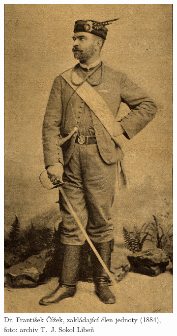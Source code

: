 \documentclass[a5paper, 11pt, twoside]{article}
\begin{document}
\begin{figure}[h]
  \centering
  \begin{subfigure}[c]{0.4\textwidth}
   \includegraphics[width=\textwidth]{img/03_cizek.jpg}
  \caption*{Dr. František Čížek, zakládající člen jednoty (1884), foto: archiv T.~J. Sokol Libeň }
  \end{subfigure}
  \hfill
  \begin{subfigure}[c]{0.5\textwidth}

\end{subfigure}
\end{figure}
\end{document}
